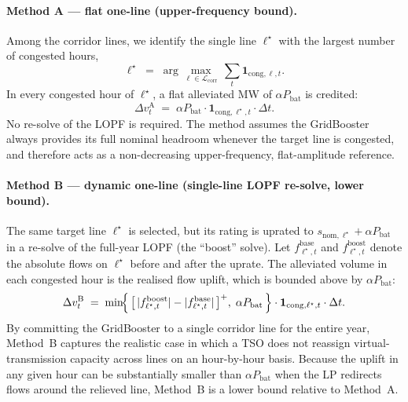 \paragraph{Method A — flat one-line (upper-frequency bound).} Among the corridor lines, we identify the single line $\ell^\star$ with the largest number of congested hours,
\begin{equation}
    \ell^\star \;=\; \arg\max_{\ell \in \mathcal{L}_{\mathrm{corr}}}\, \sum_t \mathbf{1}_{\mathrm{cong},\ell,t}.
\end{equation}
In every congested hour of $\ell^\star$, a flat alleviated MW of $\alpha P_{\mathrm{bat}}$ is credited:
\begin{equation}
    \Delta v^{\mathrm{A}}_t \;=\; \alpha P_{\mathrm{bat}} \cdot \mathbf{1}_{\mathrm{cong},\ell^\star,t} \cdot \Delta t.
    \label{eq:vol_simple}
\end{equation}
No re-solve of the LOPF is required. The method assumes the GridBooster always provides its full nominal headroom whenever the target line is congested, and therefore acts as a non-decreasing upper-frequency, flat-amplitude reference.
 
\paragraph{Method B — dynamic one-line (single-line LOPF re-solve, lower bound).} The same target line $\ell^\star$ is selected, but its rating is uprated to $s_{\mathrm{nom},\ell^\star} + \alpha P_{\mathrm{bat}}$ in a re-solve of the full-year LOPF (the ``boost'' solve). Let $f^{\mathrm{base}}_{\ell^\star,t}$ and $f^{\mathrm{boost}}_{\ell^\star,t}$ denote the absolute flows on $\ell^\star$ before and after the uprate. The alleviated volume in each congested hour is the realised flow uplift, which is bounded above by $\alpha P_{\mathrm{bat}}$:
\begin{equation}
    \Delta v^{\mathrm{B}}_t
    \;=\; \min\!\Bigl\{\, \bigl[\,|f^{\mathrm{boost}}_{\ell^\star,t}| - |f^{\mathrm{base}}_{\ell^\star,t}|\,\bigr]^{+},\; \alpha P_{\mathrm{bat}} \,\Bigr\} \cdot \mathbf{1}_{\mathrm{cong},\ell^\star,t} \cdot \Delta t.
    \label{eq:vol_oneline}
\end{equation}
By committing the GridBooster to a single corridor line for the entire year, Method~B captures the realistic case in which a TSO does not reassign virtual-transmission capacity across lines on an hour-by-hour basis. Because the uplift in any given hour can be substantially smaller than $\alpha P_{\mathrm{bat}}$ when the LP redirects flows around the relieved line, Method~B is a lower bound relative to Method~A.
 
